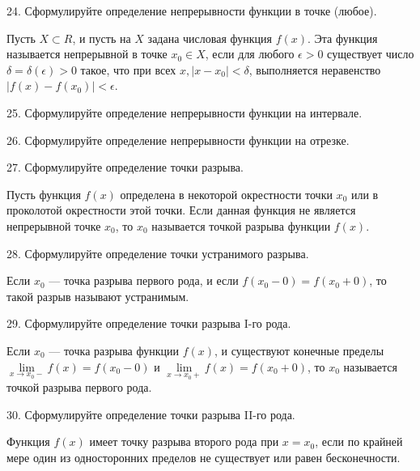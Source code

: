\documentclass[a4paper, 10pt]{article}
\begin{document}
    \begin{bf}24. Сформулируйте определение непрерывности функции в точке (любое).\end{bf}

    Пусть $X \subset R$, и пусть на $X$ задана числовая функция $f(x)$. Эта функция 
    называется непрерывной в точке $x_0 \in X$, если для любого $\epsilon > 0$ существует 
    число $\delta = \delta(\epsilon) > 0$ такое, что при всех $x, | x - x_0 | < \delta$, 
    выполняется неравенство $| f(x) - f(x_0) | < \epsilon$.

    \begin{bf}25. Сформулируйте определение непрерывности функции на интервале.\end{bf}

    \begin{bf}26. Сформулируйте определение непрерывности функции на отрезке.\end{bf}

    \begin{bf}27. Сформулируйте определение точки разрыва.\end{bf}

    Пусть функция $f(x)$ определена в некоторой окрестности точки $x_0$ или в 
    проколотой окрестности этой точки. Если данная функция не является непрерывной 
    точке $x_0$, то $x_0$ называется точкой разрыва функции $f(x)$.

    \begin{bf}28. Сформулируйте определение точки устранимого разрыва.\end{bf}

    Если $x_0$ — точка разрыва первого рода, и если $f(x_0 - 0) = f(x_0 + 0)$, то такой разрыв называют устранимым.

    \begin{bf}29. Сформулируйте определение точки разрыва I-го рода.\end{bf}
    
    Если $x_0$ — точка разрыва функции $f(x)$, и существуют конечные пределы
    $\lim\limits_{x \to x_0-} f(x) = f(x_0 - 0)$ и $\lim\limits_{x \to x_0+} f(x) = f(x_0 + 0)$,
    то $x_0$ называется точкой разрыва первого рода.

    \begin{bf}30. Сформулируйте определение точки разрыва II-го рода.\end{bf}
    
    Функция $f(x)$ имеет точку разрыва второго рода при $x=x_0$, если по крайней мере один 
    из односторонних пределов не существует или равен бесконечности.
\end{document}
